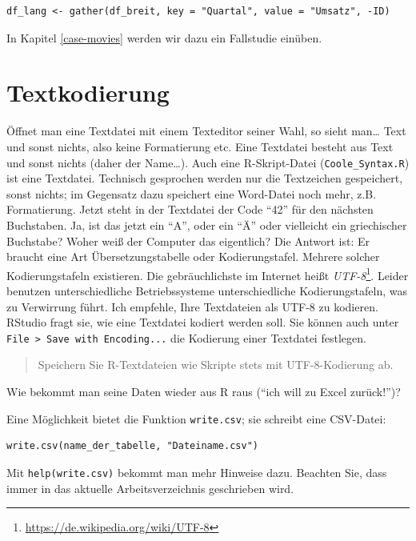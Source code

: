 \documentclass[12pt,ngerman,]{book}
\let\rmarkdownfootnote\footnote%
\def\footnote{\protect\rmarkdownfootnote}
\theoremstyle{definition}
\theoremstyle{definition}
\theoremstyle{remark}
\begin{document}
\begin{verbatim}
df_lang <- gather(df_breit, key = "Quartal", value = "Umsatz", -ID)
\end{verbatim}

In Kapitel \ref{case-movies} werden wir dazu ein Fallstudie einüben.

\section{Textkodierung}\label{textkodierung}

Öffnet man eine Textdatei mit einem Texteditor seiner Wahl, so sieht
man\ldots{} Text und sonst nichts, also keine Formatierung etc. Eine
Textdatei besteht aus Text und sonst nichts (daher der Name\ldots{}).
Auch eine R-Skript-Datei (\texttt{Coole\_Syntax.R}) ist eine Textdatei.
Technisch gesprochen werden nur die Textzeichen gespeichert, sonst
nichts; im Gegensatz dazu speichert eine Word-Datei noch mehr, z.B.
Formatierung. Jetzt steht in der Textdatei der Code ``42'' für den
nächsten Buchstaben. Ja, ist das jetzt ein ``A'', oder ein ``Ä'' oder
vielleicht ein griechischer Buchstabe? Woher weiß der Computer das
eigentlich? Die Antwort ist: Er braucht eine Art Übersetzungstabelle
oder Kodierungstafel. Mehrere solcher Kodierungstafeln existieren. Die
gebräuchlichste im Internet heißt \emph{UTF-8}\footnote{\url{https://de.wikipedia.org/wiki/UTF-8}}.
Leider benutzen unterschiedliche Betriebssysteme unterschiedliche
Kodierungstafeln, was zu Verwirrung führt. Ich empfehle, Ihre
Textdateien als UTF-8 zu kodieren. RStudio fragt sie, wie eine Textdatei
kodiert werden soll. Sie können auch unter
\texttt{File\ \textgreater{}\ Save\ with\ Encoding...} die Kodierung
einer Textdatei festlegen.

\begin{quote}
Speichern Sie R-Textdateien wie Skripte stets mit UTF-8-Kodierung ab.
\end{quote}

Wie bekommt man seine Daten wieder aus R raus (``ich will zu Excel
zurück!'')?

Eine Möglichkeit bietet die Funktion \texttt{write.csv}; sie schreibt
eine CSV-Datei:

\begin{verbatim}
write.csv(name_der_tabelle, "Dateiname.csv")
\end{verbatim}

Mit \texttt{help(write.csv)} bekommt man mehr Hinweise dazu. Beachten
Sie, dass immer in das aktuelle Arbeitsverzeichnis geschrieben wird.
\end{document}
